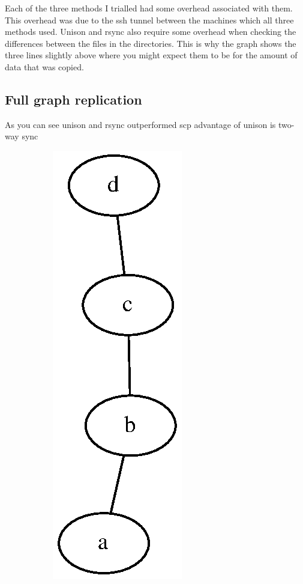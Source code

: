 \documentclass[12pt]{article}
\begin{document}
Each of the three methods I trialled had some overhead associated
with them. This overhead was due to the ssh tunnel between the
machines which all three methods used. Unison and rsync also
require some overhead when checking the differences between the files
in the directories. This is why the graph shows the three lines
slightly above where you might expect them to be for the amount
of data that was copied.

\subsection{Full graph replication}
As you can see unison and rsync outperformed scp
advantage of unison is two-way sync
\begin{figure}[htp]
    \begin{subfigure}[b]{0.5\linewidth}
        \centering
        \includegraphics[scale=0.5]{images/line-graph.eps}

\end{subfigure}
\end{figure}
\end{document}
